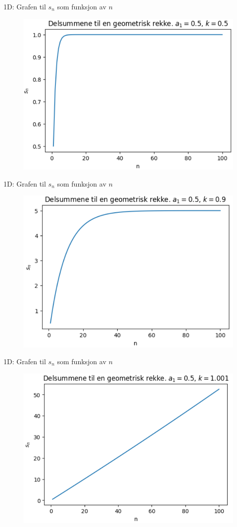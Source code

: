 \cyanheader
\begin{frame}[fragile]{1D:  Grafen til $s_n$ som funksjon av $n$}
\begin{figure}
    \centering
    \includegraphics[width=0.7\linewidth]{R2K1D-2.png}
\end{figure}
\end{frame}

\cyanheader
\begin{frame}[fragile]{1D:  Grafen til $s_n$ som funksjon av $n$}
\begin{figure}
    \centering
    \includegraphics[width=0.7\linewidth]{R2K1D-4.png}
\end{figure}
\end{frame}

\cyanheader
\begin{frame}[fragile]{1D:  Grafen til $s_n$ som funksjon av $n$}
\begin{figure}
    \centering
    \includegraphics[width=0.7\linewidth]{R2K1D-5.png}
\end{figure}
\end{frame}

